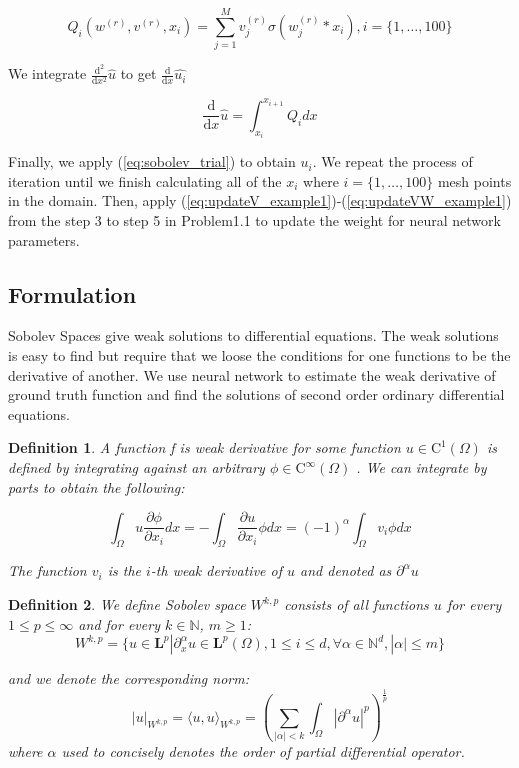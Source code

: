 \documentclass{article}
\newtheorem{definition}{Definition}[section]
\begin{document}
\[Q_i (w^{(r)},v^{(r)},x_i)=  \sum_{j=1}^{M}  v_{j}^{(r)}\sigma (w_{j}^{(r)}*x_i), i = \{1, \dots, 100\}\]

We integrate $\frac{\mathrm{d}^{2}}{\mathrm{d}x^{2}}\hat{u}$ to get $\frac{\mathrm{d}}{\mathrm{d}x}\hat{u_{i}}$

\begin{equation}
\frac{\mathrm{d}}{\mathrm{d}x}\hat{u} = \int_{x_{i}}^{x_{i+1}}Q_{i} dx
\end{equation}

Finally, we apply (\ref{eq:sobolev_trial}) to obtain $u_{i}$. We repeat the process of iteration until we finish calculating all of the $x_i$ where $i=\{1, \dots, 100\}$ mesh points in the domain.  
Then, apply (\ref{eq:updateV_example1})-(\ref{eq:updateVW_example1}) from the step 3 to step 5 in Problem1.1 to update the weight for neural network parameters.



\subsection{Formulation}

Sobolev Spaces give weak solutions
to differential equations.
The weak solutions is easy to find but require that we loose the conditions for one functions to be the derivative of another. 
We use neural network to estimate the weak derivative of ground truth function and  find the solutions of second order ordinary differential equations. 


\begin{definition}
	A function f is weak derivative for some function $u \in \mathrm{C}^{1}(\Omega)$ is defined by integrating against an arbitrary $\phi \in \mathrm{C}^{\infty}(\Omega)$ . We can integrate by parts to obtain the following:

			\[\int_{\Omega}u \frac{\partial \phi}{\partial x_{i}} dx
			=  -  \int_{\Omega} \frac{\partial u}{\partial x_{i}} \phi dx =   (-1)^{\alpha}\int_{\Omega} v_{i} \phi dx\]
			
	The function $v_i$ is the $i$-th weak derivative of $u$ and denoted as $\partial^{\alpha}u$
	
\end{definition}

\begin{definition}
	We define Sobolev space $W^{k,p}$ consists of all functions $u$ for every $1\leq p\leq \infty$ and for every $k\in \mathbb{N}$, $m \geq 1$: 
	\[W^{k,p} = \{u \in \mathbf{L}^{p} |  \partial _{x}^{\alpha} u \in \mathbf{L}^{p}(\Omega), 1 \leq i \leq d, \forall \alpha \in \mathbb{N}^{d},|\alpha| \leq m \}\]
	

	 \medspace \noindent
	and we denote the corresponding norm:
	\begin{equation}
     	\left|u\right|_{W^{k,p}}=\langle u,u\rangle_{W^{k,p} }= \left(\sum_{|\alpha| < k}\int_{\Omega} |\partial^{\alpha} u|^{p}\right)^{\frac{1}{p}}
	\end{equation}
   \medspace \noindent
   where $\alpha$ used to concisely denotes the order of partial differential operator. 
\end{definition}
\end{document}

